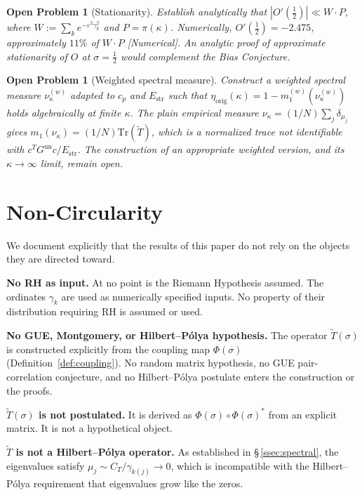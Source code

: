 \documentclass[11pt]{article}
\newtheorem{openproblem}[theorem]{Open Problem}
\newcommand{\Estr}{E_{\mathrm{str}}}
\newcommand{\etaorig}{\eta_{\mathrm{orig}}}
\newcommand{\Tt}{\widetilde{T}}
\newcommand{\Gun}{G^{\mathrm{un}}}
\newcommand{\CT}{C_{T}}
\begin{document}
\begin{openproblem}[Stationarity]\label{op:stat}
\label{op:stat}
Establish analytically that $|O'(\tfrac{1}{2})|\ll W\cdot P$,
where $W:=\sum_k e^{-\varepsilon^2\gamma_k^2}$ and $P=\pi(\kappa)$.
Numerically, $O'(\tfrac{1}{2})=-2.475$, approximately $11\%$ of $W\cdot P$
[Numerical].
An analytic proof of approximate stationarity of $O$ at $\sigma=\tfrac{1}{2}$
would complement the Bias Conjecture.
\end{openproblem}

\begin{openproblem}[Weighted spectral measure]\label{op:measure}
\label{op:measure}
Construct a weighted spectral measure $\nu^{(w)}_\kappa$ adapted to
$c_p$ and $\Estr$ such that
$\etaorig(\kappa) = 1 - m_1^{(w)}(\nu^{(w)}_\kappa)$
holds algebraically at finite $\kappa$.
The plain empirical measure $\nu_\kappa=(1/N)\sum_j\delta_{\mu_j}$ gives
$m_1(\nu_\kappa)=(1/N)\mathrm{Tr}(\Tt)$, which is a normalized trace
not identifiable with $c^T\Gun c/\Estr$.
The construction of an appropriate weighted version,
and its $\kappa\to\infty$ limit, remain open.
\end{openproblem}

\section{Non-Circularity}
\label{sec:nocirc}

We document explicitly that the results of this paper do not rely
on the objects they are directed toward.

\textbf{No RH as input.}
At no point is the Riemann Hypothesis assumed.
The ordinates $\gamma_k$ are used as numerically specified inputs.
No property of their distribution requiring RH is assumed or used.

\textbf{No GUE, Montgomery, or Hilbert--P\'olya hypothesis.}
The operator $\Tt(\sigma)$ is constructed explicitly from the coupling
map $\Phi(\sigma)$ (Definition~\ref{def:coupling}).
No random matrix hypothesis, no GUE pair-correlation conjecture,
and no Hilbert--P\'olya postulate enters the construction or the proofs.

\textbf{$\Tt(\sigma)$ is not postulated.}
It is derived as $\Phi(\sigma)\circ\Phi(\sigma)^*$ from an explicit matrix.
It is not a hypothetical object.

\textbf{$\Tt$ is not a Hilbert--P\'olya operator.}
As established in \S\,\ref{ssec:spectral}, the eigenvalues satisfy
$\mu_j\sim\CT/\gamma_{k(j)}\to 0$, which is incompatible with the
Hilbert--P\'olya requirement that eigenvalues grow like the zeros.
\end{document}
